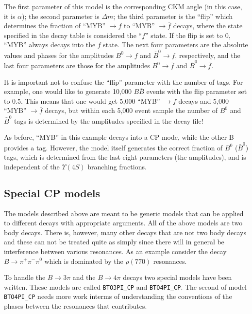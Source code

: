 The first parameter of this model is the corresponding CKM angle (in this case, it is $\alpha$); the second parameter is $\Delta m$; the third parameter is the ``flip'' which determines the fraction of ``MYB'' $\rightarrow f$ to ``MYB'' $\rightarrow \overline{f}$ decays, where the state specified in the decay table is considered the ``$f$'' state.  If the flip is set to 0, ``MYB'' always decays into the $f$ state.  The next four parameters are the absolute values and phases for the amplitudes $B^{0} \rightarrow f$ and $\bar B^{0} \rightarrow f$, respectively, and the last four parameters are those for the amplitudes $B^{0} \rightarrow \overline{f}$ and $\overline{B}^{0} \rightarrow \overline{f}$.

It is important not to confuse the ``flip'' parameter with the number of tags.  For example, one would like to generate 10,000 $B\overline{B}$ events with the flip parameter set to 0.5.  This means that one would get 5,000 ``MYB'' $\rightarrow f$ decays and 5,000 ``MYB'' $\rightarrow \overline{f}$ decays, but within each 5,000 event sample the number of $B^{0}$ and $\bar B^{0}$ tags is determined by the amplitudes specified in the decay file! 

As before, ``MYB'' in this example decays into a CP-mode, while the other B provides a tag.  However, the model itself generates the correct fraction of $B^{0}$ ($\bar B^{0}$) tags, which is determined from the last eight parameters (the amplitudes), and is independent of the $\Upsilon(4S)$ branching fractions.



\subsection{Special CP models}

 The models described above are meant to be generic models that can
be applied to different decays with appropriate arguments. All of the
above models are two body decays. There is, however, many other decays
that are not two body decays and these can not be treated quite as
simply since there will in general be interference between various
resonances. As an example consider the decay $B\rightarrow \pi^+\pi^-\pi^0$
which is dominated by the $\rho(770)$ resonances.

 To handle the $B\rightarrow 3\pi$ and the $B\rightarrow 4\pi$
decays two special models have been written. These models are 
called {\tt BTO3PI\_CP} and {\tt BTO4PI\_CP}. The second
of model {\tt BTO4PI\_CP} needs more work interms of understanding the
conventions of the phases between the resonances that contributes.

